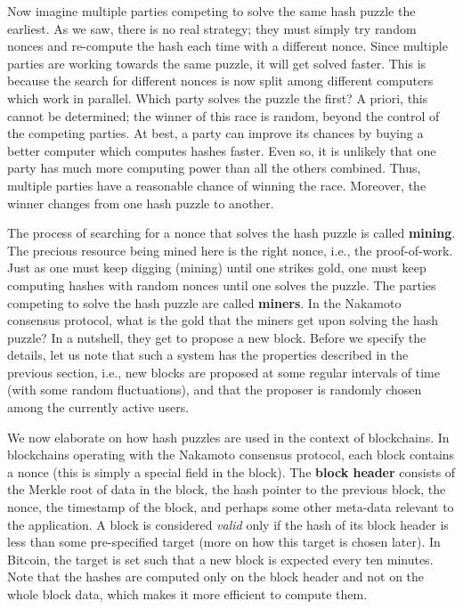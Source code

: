 \documentclass{article}
\begin{document}
Now imagine multiple parties competing to solve the same hash puzzle the earliest. As we saw, there is no real strategy; they must simply try random nonces and re-compute the hash each time with a different nonce. Since multiple parties are working towards the same puzzle, it will get solved faster. This is because the search for different nonces is now split among different computers which work in parallel. Which party solves the puzzle the first? A priori, this cannot be determined; the winner of this race is random, beyond the control of the competing parties. At best, a party can improve its chances by buying a better computer which computes hashes faster. Even so, it is unlikely that one party has much more computing power than all the others combined. Thus, multiple parties have a reasonable chance of winning the race. Moreover, the winner changes from one hash puzzle to another.

The process of searching for a nonce that solves the hash puzzle is called \textbf{mining}. The precious resource being mined here is the right nonce, i.e., the proof-of-work. Just as one must keep digging (mining) until one strikes gold, one must keep computing hashes with random nonces until one solves the puzzle. The parties competing to solve the hash puzzle are called \textbf{miners}. In the Nakamoto consensus protocol, what is the gold that the miners get upon solving the hash puzzle? In a nutshell, they get to propose a new block. Before we specify the details, let us note that such a system has the properties described in the previous section, i.e., new blocks are proposed at some regular intervals of time (with some random fluctuations), and that the proposer is randomly chosen among the currently active users.

We now elaborate on how hash puzzles are used in the context of blockchains. In blockchains operating with the Nakamoto consensus protocol, each block contains a nonce (this is simply a special field in the block). The \textbf{block header} consists of the Merkle root of data in the block, the hash pointer to the previous block, the nonce, the timestamp of the block, and perhaps some other meta-data relevant to the application. A block is considered \textit{valid} only if the hash of its block header is less than some pre-specified target  (more on how this target is chosen later). In Bitcoin, the target is set such that a new block is expected every ten minutes. Note that the hashes are computed only on the block header and not on the whole block data, which makes it more efficient to compute them.
\end{document}
